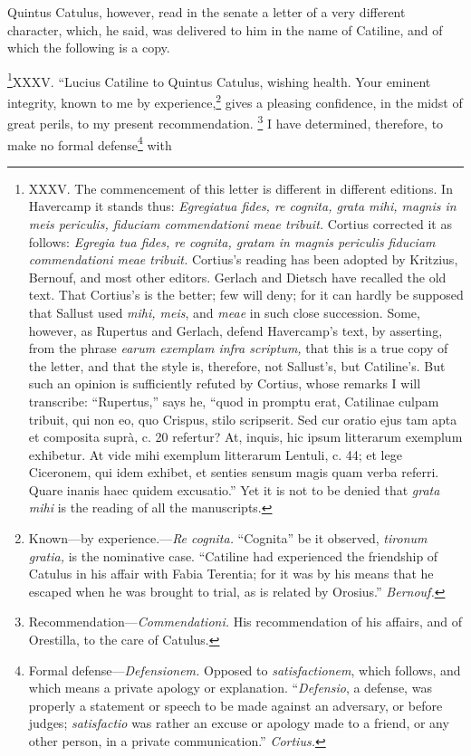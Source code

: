 Quintus Catulus, however, read in the senate a letter of a very
different character, which, he said, was delivered to him in the
name of Catiline, and of which the following is a copy.

\footnote{XXXV. The commencement of this letter is different in different
editions. In Havercamp it stands thus: \emph{Egregiatua fides, re cognita,
grata mihi, magnis in meis periculis, fiduciam commendationi meae
tribuit.} Cortius corrected it as follows: \emph{Egregia tua fides, re
cognita, gratam in magnis periculis fiduciam commendationi meae
tribuit.} Cortius's reading has been adopted by Kritzius, Bernouf, and
most other editors. Gerlach and Dietsch have recalled the old text.
That Cortius's is the better; few will deny; for it can hardly be
supposed that Sallust used \emph{mihi, meis}, and \emph{meae} in such close
succession. Some, however, as Rupertus and Gerlach, defend Havercamp's
text, by asserting, from the phrase \emph{earum exemplam infra scriptum,}
that this is a true copy of the letter, and that the style is,
therefore, not Sallust's, but Catiline's. But such an opinion is
sufficiently refuted by Cortius, whose remarks I will transcribe:
``Rupertus,'' says he, ``quod in promptu erat, Catilinae culpam tribuit,
qui non eo, quo Crispus, stilo scripserit. Sed cur oratio ejus tam
apta et composita suprà, c. 20 refertur? At, inquis, hic ipsum
litterarum exemplum exhibetur. At vide mihi exemplum litterarum
Lentuli, c. 44; et lege Ciceronem, qui idem exhibet, et senties sensum
magis quam verba referri. Quare inanis haec quidem excusatio.'' Yet it
is not to be denied that \emph{grata mihi} is the reading of all the
manuscripts.}XXXV. ``Lucius Catiline to Quintus Catulus, wishing health. Your
eminent integrity, known to me by experience,\footnote{Known—by experience.—\emph{Re cognita.} ``Cognita'' be it observed,
\emph{tironum gratia,} is the nominative case. ``Catiline had experienced
the friendship of Catulus in his affair with Fabia Terentia; for it
was by his means that he escaped when he was brought to trial, as is
related by Orosius.'' \emph{Bernouf.}} gives a pleasing
confidence, in the midst of great perils, to my present recommendation.
\footnote{Recommendation—\emph{Commendationi.} His recommendation of his
affairs, and of Orestilla, to the care of Catulus.} I have determined, therefore, to make no formal defense\footnote{Formal defense—\emph{Defensionem.} Opposed to \emph{satisfactionem},
which follows, and which means a private apology or explanation.
``\emph{Defensio}, a defense, was properly a statement or speech to be made
against an adversary, or before judges; \emph{satisfactio} was rather an
excuse or apology made to a friend, or any other person, in a private
communication.'' \emph{Cortius.}} with
